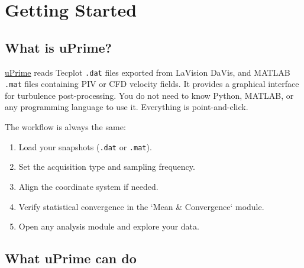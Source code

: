 \section{Getting Started}

\subsection{What is uPrime?}

\href{https://cmdrryder.github.io/uPrime/}{uPrime} reads Tecplot \texttt{.dat} files exported from LaVision DaVis, and MATLAB \texttt{.mat} files containing PIV or CFD velocity fields. It provides a graphical interface for turbulence post-processing. You do not need to know Python, MATLAB, or any programming language to use it. Everything is point-and-click.

The workflow is always the same:
\begin{enumerate}[leftmargin=1.5em]
  \item Load your snapshots (\texttt{.dat} or \texttt{.mat}).
  \item Set the acquisition type and sampling frequency.
  \item Align the coordinate system if needed.
  \item Verify statistical convergence in the `Mean \& Convergence` module.
  \item Open any analysis module and explore your data.
\end{enumerate}

\subsection{What uPrime can do}

